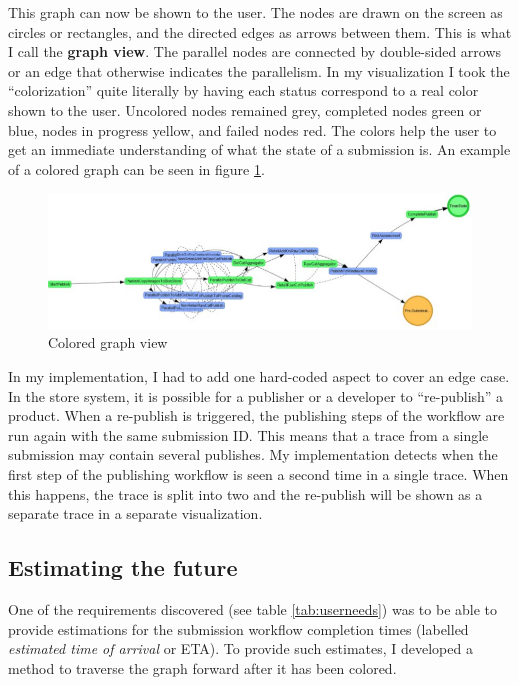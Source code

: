 This graph can now be shown to the user.
The nodes are drawn on the screen as circles or rectangles, and the directed edges as arrows between them.
This is what I call the \textbf{graph view}.
The parallel nodes are connected by double-sided arrows or an edge that otherwise indicates the parallelism.
In my visualization I took the ``colorization'' quite literally by having each status correspond to a real color shown to the user.
Uncolored nodes remained grey, completed nodes green or blue, nodes in progress yellow, and failed nodes red.
The colors help the user to get an immediate understanding of what the state of a submission is.
An example of a colored graph can be seen in figure \ref{fig:coloredgraph}.

\begin{figure}[htb]
    \centering \includegraphics[width=0.9\linewidth]{gfx/screenshots/graphcolor.png}
    \caption{Colored graph view}
    \label{fig:coloredgraph}
\end{figure}

In my implementation, I had to add one hard-coded aspect to cover an edge case. 
In the store system, it is possible for a publisher or a developer to ``re-publish'' a product. 
When a re-publish is triggered, the publishing steps of the workflow are run again with the same submission ID. 
This means that a trace from a single submission may contain several publishes.
My implementation detects when the first step of the publishing workflow is seen a second time in a single trace. 
When this happens, the trace is split into two and the re-publish will be shown as a separate trace in a separate visualization.

\subsection{Estimating the future}

One of the requirements discovered (see table \ref{tab:userneeds}) was to be able to provide estimations for the submission workflow completion times (labelled \emph{estimated time of arrival} or ETA). 
To provide such estimates, I developed a method to traverse the graph forward after it has been colored.

